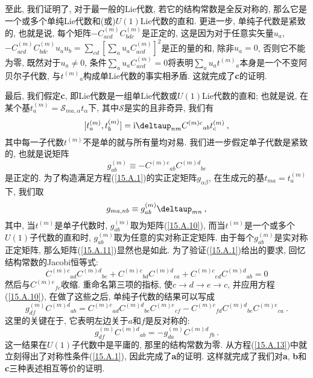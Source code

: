 至此, 我们证明了, 对于最一般的Lie代数, 若它的结构常数是全反对称的, 那么它是一个或多个单纯Lie代数和(或)$U(1)$Lie代数的直和. 更进一步, %
单纯子代数是紧致的, 也就是说, 每个矩阵$-C^{(m)}_{acd}C^{(m)}_{bdc}$是正定的, 这是因为对于任意实矢量$u_{a}$, $-C^{(m)}_{acd}C^{(m)}_{bdc}u_{a}u_{b}=\sum_{cd}[\sum_{a}u_{a}C^{(m)}_{acd}]^2$是正的量的和, 除非$u_{a}=0$, 否则它不能为零, 既然对于$u_{a} \neq 0$, 条件$\sum_{a}u_{a}C^{(m)}_{acd}=0$将表明$\sum_{a}u_{a}t^{(m)}{}_{a}$本身是一个不变阿贝尔子代数, 与$t^{(m)}{}_{a}$构成单Lie代数的事实相矛盾. 这就完成了{\bf{c}}的证明.

最后, 我们假定\textbf{c}, 即Lie代数是一组单Lie代数或$U(1)$Lie代数的直和; 也就是说, 在某个基$t_{a}^{(m)}=\mathscr{S}%
_{ma,\alpha }t_{\alpha }$下, 其中$\mathscr{S}$是实的且非奇异, 我们有
\[
[ t_{a}^{(m)},t_{b}^{(m)}]=\mi\deltaup  _{nm}C^{(m)c}{}_{ab}t_{c}^{(m)} \:, 
\]
其中每一子代数$t^{(m)}$不是单的就与所有量均对易. 我们进一步假定单子代数是紧致的, 也就是说矩阵
\begin{equation}
g_{ab}^{(m)}\equiv -C^{(m)c}{}_{ab}C^{(m)d}{}_{bc}  \label{15.A.10}
\end{equation}%
是正定的. 为了构造满足方程(\ref{15.A.1})的实正定矩阵$g_{\alpha \beta }$, 在生成元的基$t_{ma}=t_{a}^{(m)}$下, 我们取%
\begin{equation}
g_{ma,nb}\equiv g_{ab}^{(m)}\deltaup  _{mn}\:,   \label{15.A.11}
\end{equation}%
其中, 当$t^{(m)}$是单子代数时, $g_{ab}^{(m)}$取为矩阵(\ref{15.A.10}), 而当$t^{(m)}$是一个或多个$U(1)$子代数的直和时, $%
g_{ab}^{(m)}$取为任意的实对称正定矩阵. 由于每个$g_{ab}^{(m)}$是实对称正定矩阵, 那么矩阵(\ref{15.A.11})显然也是如此. 
为了验证(\ref{15.A.1})给出的要求, 回忆结构常数的Jacobi恒等式:%
\begin{equation}
C^{(m)c}{}_{ad}C^{(m)d}{}_{be}+C^{(m)c}{}_{bd}C^{(m)d}{}_{ea}+C^{(m)c}{}_{ed}C^{(m)d}{}_{ab}=0 \label{15,.A.12}
\end{equation}%
然后与$C^{(m)e}{}_{fc}$收缩. 重命名第三项的指标, 使$c\rightarrow d\rightarrow e\rightarrow c$, 
并应用方程(\ref{15.A.10}), 在做了这些之后, 单纯子代数的结果可以写成
\[
g_{df}^{(m)}C^{(m)d}{}_{ab}=C^{(m)c}{}_{ad}C^{(m)d}{}_{be}C^{(m)e}{}_{cf}-C^{(m)c}{}_{fd}C^{(m)d}{}_{be}C^{(m)e}{}_{ca}%
\:. 
\]%
这里的关键在于, 它表明左边关于$a$和$f$是反对称的:%
\begin{equation}
g_{df}^{(m)}C^{(m)d}{}_{ab}=-g_{da}^{(m)}C^{(m)d}{}_{fb}\:. \label{15.A.13}
\end{equation}%
这一结果在$U(1)$子代数中是平庸的, 那里的结构常数为零. 从方程(\ref{15.A.13})中就立刻得出了对称性条件(\ref{15.A.1}), 
因此完成了\textbf{a}的证明. 这样就完成了我们对\textbf{a}, \textbf{b}和\textbf{c}三种表述相互等价的证明.


